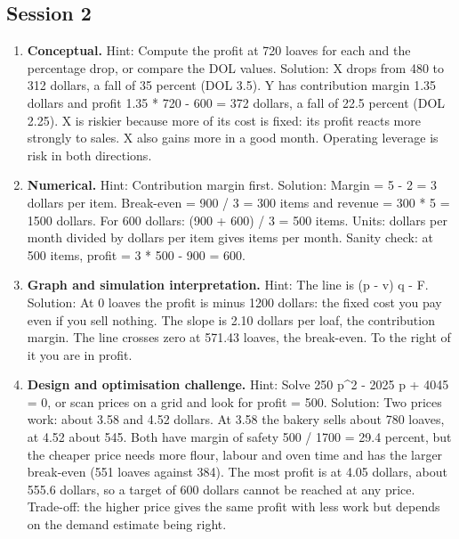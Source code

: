 \documentclass[11pt,a4paper]{article}
\begin{document}
\subsection*{Session 2}
\begin{enumerate}[nosep]
\item \textbf{Conceptual.} Hint: Compute the profit at 720 loaves for each and the percentage drop, or compare the DOL values. Solution: X drops from 480 to 312 dollars, a fall of 35 percent (DOL 3.5). Y has contribution margin 1.35 dollars and profit 1.35 * 720 - 600 = 372 dollars, a fall of 22.5 percent (DOL 2.25). X is riskier because more of its cost is fixed: its profit reacts more strongly to sales. X also gains more in a good month. Operating leverage is risk in both directions.
\item \textbf{Numerical.} Hint: Contribution margin first. Solution: Margin = 5 - 2 = 3 dollars per item. Break-even = 900 / 3 = 300 items and revenue = 300 * 5 = 1500 dollars. For 600 dollars: (900 + 600) / 3 = 500 items. Units: dollars per month divided by dollars per item gives items per month. Sanity check: at 500 items, profit = 3 * 500 - 900 = 600.
\item \textbf{Graph and simulation interpretation.} Hint: The line is (p - v) q - F. Solution: At 0 loaves the profit is minus 1200 dollars: the fixed cost you pay even if you sell nothing. The slope is 2.10 dollars per loaf, the contribution margin. The line crosses zero at 571.43 loaves, the break-even. To the right of it you are in profit.
\item \textbf{Design and optimisation challenge.} Hint: Solve 250 p\textasciicircum{}2 - 2025 p + 4045 = 0, or scan prices on a grid and look for profit = 500. Solution: Two prices work: about 3.58 and 4.52 dollars. At 3.58 the bakery sells about 780 loaves, at 4.52 about 545. Both have margin of safety 500 / 1700 = 29.4 percent, but the cheaper price needs more flour, labour and oven time and has the larger break-even (551 loaves against 384). The most profit is at 4.05 dollars, about 555.6 dollars, so a target of 600 dollars cannot be reached at any price. Trade-off: the higher price gives the same profit with less work but depends on the demand estimate being right.
\end{enumerate}
\end{document}
